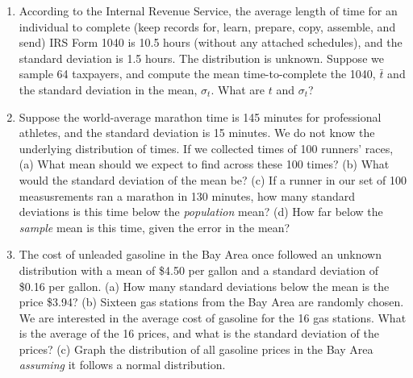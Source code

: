 \documentclass{article}
\begin{document}
\begin{enumerate}
\item According to the Internal Revenue Service, the average length of time for an individual to complete (keep records for, learn, prepare, copy, assemble, and send) IRS Form 1040 is 10.5 hours (without any attached schedules), and the standard deviation is 1.5 hours. The distribution is unknown.  Suppose we sample 64 taxpayers, and compute the mean time-to-complete the 1040, $\bar{t}$ and the standard deviation in the mean, $\sigma_t$.  What are $t$ and $\sigma_t$? \\ \vspace{1cm}
\item Suppose the world-average marathon time is 145 minutes for professional athletes, and the standard deviation is 15 minutes.  We do not know the underlying distribution of times.  If we collected times of 100 runners' races, (a) What mean should we expect to find across these 100 times? (b) What would the standard deviation of the mean be? (c) If a runner in our set of 100 measusrements ran a marathon in 130 minutes, how many standard deviations is this time below the \textit{population} mean? (d) How far below the \textit{sample} mean is this time, given the error in the mean? \\ \vspace{1.5cm}
\item The cost of unleaded gasoline in the Bay Area once followed an unknown distribution with a mean of \$4.50 per gallon and a standard deviation of \$0.16 per gallon. (a) How many standard deviations below the mean is the price \$3.94? (b) Sixteen gas stations from the Bay Area are randomly chosen. We are interested in the average cost of gasoline for the 16 gas stations. What is the average of the 16 prices, and what is the standard deviation of the prices? (c) Graph the distribution of all gasoline prices in the Bay Area \textit{assuming} it follows a normal distribution.
\end{enumerate}
\end{document}
